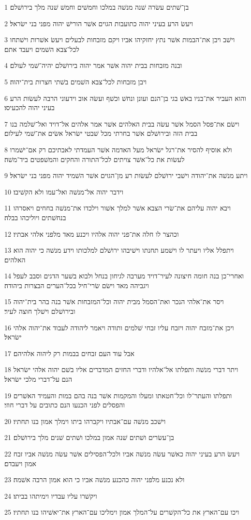 \par 1 בן־שׁתים עשׂרה שׁנה מנשׁה במלכו וחמשׁים וחמשׁ שׁנה מלך בירושׁלם׃
\par 2 ויעשׂ הרע בעיני יהוה כתועבות הגוים אשׁר הורישׁ יהוה מפני בני ישׂראל׃
\par 3 וישׁב ויבן את־הבמות אשׁר נתץ יחזקיהו אביו ויקם מזבחות לבעלים ויעשׂ אשׁרות וישׁתחו לכל־צבא השׁמים ויעבד אתם׃
\par 4 ובנה מזבחות בבית יהוה אשׁר אמר יהוה בירושׁלם יהיה־שׁמי לעולם׃
\par 5 ויבן מזבחות לכל־צבא השׁמים בשׁתי חצרות בית־יהוה׃
\par 6 והוא העביר את־בניו באשׁ בגי בן־הנם ועונן ונחשׁ וכשׁף ועשׂה אוב וידעוני הרבה לעשׂות הרע בעיני יהוה להכעיסו׃
\par 7 וישׂם את־פסל הסמל אשׁר עשׂה בבית האלהים אשׁר אמר אלהים אל־דויד ואל־שׁלמה בנו בבית הזה ובירושׁלם אשׁר בחרתי מכל שׁבטי ישׂראל אשׂים את־שׁמי לעילום׃
\par 8 ולא אוסיף להסיר את־רגל ישׂראל מעל האדמה אשׁר העמדתי לאבתיכם רק אם־ישׁמרו לעשׂות את כל־אשׁר צויתים לכל־התורה והחקים והמשׁפטים ביד־משׁה׃
\par 9 ויתע מנשׁה את־יהודה וישׁבי ירושׁלם לעשׂות רע מן־הגוים אשׁר השׁמיד יהוה מפני בני ישׂראל׃
\par 10 וידבר יהוה אל־מנשׁה ואל־עמו ולא הקשׁיבו׃
\par 11 ויבא יהוה עליהם את־שׂרי הצבא אשׁר למלך אשׁור וילכדו את־מנשׁה בחחים ויאסרהו בנחשׁתים ויוליכהו בבלה׃
\par 12 וכהצר לו חלה את־פני יהוה אלהיו ויכנע מאד מלפני אלהי אבתיו׃
\par 13 ויתפלל אליו ויעתר לו וישׁמע תחנתו וישׁיבהו ירושׁלם למלכותו וידע מנשׁה כי יהוה הוא האלהים׃
\par 14 ואחרי־כן בנה חומה חיצונה לעיר־דויד מערבה לגיחון בנחל ולבוא בשׁער הדגים וסבב לעפל ויגביהה מאד וישׂם שׂרי־חיל בכל־הערים הבצרות ביהודה׃
\par 15 ויסר את־אלהי הנכר ואת־הסמל מבית יהוה וכל־המזבחות אשׁר בנה בהר בית־יהוה ובירושׁלם וישׁלך חוצה לעיר׃
\par 16 ויכן את־מזבח יהוה ויזבח עליו זבחי שׁלמים ותודה ויאמר ליהודה לעבוד את־יהוה אלהי ישׂראל׃
\par 17 אבל עוד העם זבחים בבמות רק ליהוה אלהיהם׃
\par 18 ויתר דברי מנשׁה ותפלתו אל־אלהיו ודברי החזים המדברים אליו בשׁם יהוה אלהי ישׂראל הנם על־דברי מלכי ישׂראל׃
\par 19 ותפלתו והעתר־לו וכל־חטאתו ומעלו והמקמות אשׁר בנה בהם במות והעמיד האשׁרים והפסלים לפני הכנעו הנם כתובים על דברי חוזי׃
\par 20 וישׁכב מנשׁה עם־אבתיו ויקברהו ביתו וימלך אמון בנו תחתיו׃
\par 21 בן־עשׂרים ושׁתים שׁנה אמון במלכו ושׁתים שׁנים מלך בירושׁלם׃
\par 22 ויעשׂ הרע בעיני יהוה כאשׁר עשׂה מנשׁה אביו ולכל־הפסילים אשׁר עשׂה מנשׁה אביו זבח אמון ויעבדם׃
\par 23 ולא נכנע מלפני יהוה כהכנע מנשׁה אביו כי הוא אמון הרבה אשׁמה׃
\par 24 ויקשׁרו עליו עבדיו וימיתהו בביתו׃
\par 25 ויכו עם־הארץ את כל־הקשׁרים על־המלך אמון וימליכו עם־הארץ את־יאשׁיהו בנו תחתיו׃

